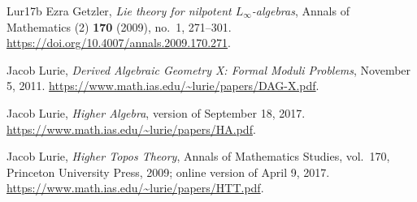 \documentclass[12pt,letterpaper,oneside]{report}
\theoremstyle{definition}
\theoremstyle{remark}
\newcommand{\CAlg}{\mathrm{CAlg}}
\newcommand{\Lie}{\mathrm{Lie}}
\newcommand{\Map}{\operatorname{Map}}
\newcommand{\Free}{\operatorname{Free}}
\newcommand{\aug}{\mathrm{aug}}
\newcommand{\g}{\mathfrak g}
\newcommand{\CE}{C^*}
\begin{document}


\clearpage
{}
{}
\begin{thebibliography}{Lur17b}
Ezra Getzler, \emph{Lie theory for nilpotent $L_\infty$-algebras}, Annals of Mathematics (2) \textbf{170} (2009), no.~1, 271--301.\newline
\url{https://doi.org/10.4007/annals.2009.170.271}.

Jacob Lurie, \emph{Derived Algebraic Geometry X: Formal Moduli Problems}, November 5, 2011.\newline
\url{https://www.math.ias.edu/~lurie/papers/DAG-X.pdf}.

Jacob Lurie, \emph{Higher Algebra}, version of September 18, 2017.\newline
\url{https://www.math.ias.edu/~lurie/papers/HA.pdf}.

Jacob Lurie, \emph{Higher Topos Theory}, Annals of Mathematics Studies, vol.~170, Princeton University Press, 2009; online version of April 9, 2017.\newline
\url{https://www.math.ias.edu/~lurie/papers/HTT.pdf}.
\end{thebibliography}
\end{document}

